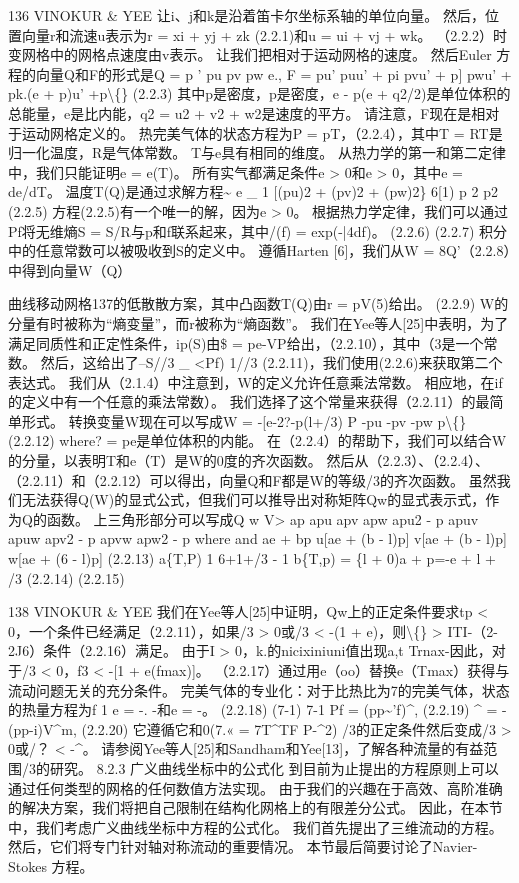 \documentclass[UTF8,11pt,a4paper,openany,fontset=fandol]{ctexbook}
\begin{document}
136 VINOKUR \& YEE 让i、j和k是沿着笛卡尔坐标系轴的单位向量。 然后，位置向量r和流速u表示为r = xi + yj + zk (2.2.1)和u = ui + vj + wk。 （2.2.2）时变网格中的网格点速度由v表示。 让我们把相对于运动网格的速度。 然后Euler 方程的向量Q和F的形式是Q = p ' pu pv pw e., F = pu' puu' + pi pvu' + p] pwu' + pk.(e + p)u' +p\textbackslash\{\} (2.2.3) 其中p是密度，p是密度，e - p(e + q2/2)是单位体积的总能量，e是比内能，q2 = u2 + v2 + w2是速度的平方。 请注意，F现在是相对于运动网格定义的。 热完美气体的状态方程为P = pT，（2.2.4），其中T = RT是归一化温度，R是气体常数。 T与e具有相同的维度。 从热力学的第一和第二定律中，我们只能证明e = e(T)。 所有实气都满足条件e > 0和e > 0，其中e = de/dT。 温度T(Q)是通过求解方程\textasciitilde{} e \_ 1 [(pu)2 + (pv)2 + (pw)2\} 6[1) p 2 p2 (2.2.5) 方程(2.2.5)有一个唯一的解，因为e > 0。 根据热力学定律，我们可以通过Pf将无维熵S = S/R与p和f联系起来，其中/(f) = exp(-|4df)。 (2.2.6) (2.2.7) 积分中的任意常数可以被吸收到S的定义中。 遵循Harten [6]，我们从W = 8Q'（2.2.8）中得到向量W（Q）

曲线移动网格137的低散散方案，其中凸函数T(Q)由r = pV(5)给出。 (2.2.9) W的分量有时被称为“熵变量”，而r被称为“熵函数”。 我们在Yee等人[25]中表明，为了满足同质性和正定性条件，ip(S)由\$ = pe-VP给出，（2.2.10），其中（3是一个常数。 然后，这给出了--S//3 \_ <Pf) 1//3 (2.2.11)，我们使用(2.2.6)来获取第二个表达式。 我们从（2.1.4）中注意到，W的定义允许任意乘法常数。 相应地，在if的定义中有一个任意的乘法常数）。 我们选择了这个常量来获得（2.2.11）的最简单形式。 转换变量W现在可以写成W = -[e-2?-p(l+/3) P -pu -pv -pw p\textbackslash\{\} (2.2.12) where? = pe是单位体积的内能。 在（2.2.4）的帮助下，我们可以结合W的分量，以表明T和e（T）是W的0度的齐次函数。 然后从（2.2.3）、（2.2.4）、（2.2.11）和（2.2.12）可以得出，向量Q和F都是W的等级/3的齐次函数。 虽然我们无法获得Q(W)的显式公式，但我们可以推导出对称矩阵Qw的显式表示式，作为Q的函数。 上三角形部分可以写成Q w V> ap apu apv apw apu2 - p apuv apuw apv2 - p apvw apw2 - p where and ae + bp u[ae + (b - l)p] v[ae + (b - l)p] w[ae + (6 - l)p] (2.2.13) a\{T,P) 1 6+1+/3 - 1 b\{T,p) = \{l + 0)a + p=-e + l + /3 (2.2.14) (2.2.15)

138 VINOKUR \& YEE 我们在Yee等人[25]中证明，Qw上的正定条件要求tp < 0，一个条件已经满足（2.2.11），如果/3 > 0或/3 < -(1 + e)，则\textbackslash\{\} > ITI-（2-2J6）条件（2.2.16）满足。 由于I > 0，k.的nicixiniuni值出现a,t Trnax-因此，对于/3 < 0，f3 < -[1 + e(fmax)]。 （2.2.17）通过用e（oo）替换e（Tmax）获得与流动问题无关的充分条件。 完美气体的专业化：对于比热比为7的完美气体，状态的热量方程为f 1 e = -. -和e = -。 (2.2.18) (7-1) 7-1 Pf = (pp\textasciitilde{}'f)\textasciicircum{}, (2.2.19) \textasciicircum{} = -(pp-i)V\textasciicircum{}m, (2.2.20) 它遵循它和0(7.« = 7T\textasciicircum{}TF P-\textasciicircum{}2) /3的正定条件然后变成/3 > 0或/？ < -\textasciicircum{}。 请参阅Yee等人[25]和Sandham和Yee[13]，了解各种流量的有益范围/3的研究。 8.2.3 广义曲线坐标中的公式化 到目前为止提出的方程原则上可以通过任何类型的网格的任何数值方法实现。 由于我们的兴趣在于高效、高阶准确的解决方案，我们将把自己限制在结构化网格上的有限差分公式。 因此，在本节中，我们考虑广义曲线坐标中方程的公式化。 我们首先提出了三维流动的方程。 然后，它们将专门针对轴对称流动的重要情况。 本节最后简要讨论了Navier-Stokes 方程。
\end{document}
